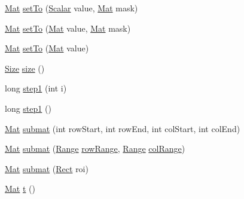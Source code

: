 \begin{DoxyCompactItemize}
\mbox{\hyperlink{classorg_1_1opencv_1_1core_1_1_mat}{Mat}} \mbox{\hyperlink{classorg_1_1opencv_1_1core_1_1_mat_a56d903b85bbe289ee484e1b22efa2a91}{set\+To}} (\mbox{\hyperlink{classorg_1_1opencv_1_1core_1_1_scalar}{Scalar}} value, \mbox{\hyperlink{classorg_1_1opencv_1_1core_1_1_mat}{Mat}} mask)
\item 
\mbox{\hyperlink{classorg_1_1opencv_1_1core_1_1_mat}{Mat}} \mbox{\hyperlink{classorg_1_1opencv_1_1core_1_1_mat_a793ccddcd93d47402e9b243ef75814b1}{set\+To}} (\mbox{\hyperlink{classorg_1_1opencv_1_1core_1_1_mat}{Mat}} value, \mbox{\hyperlink{classorg_1_1opencv_1_1core_1_1_mat}{Mat}} mask)
\item 
\mbox{\hyperlink{classorg_1_1opencv_1_1core_1_1_mat}{Mat}} \mbox{\hyperlink{classorg_1_1opencv_1_1core_1_1_mat_a3c0458f17815dd73f81e4a8dfebacb3b}{set\+To}} (\mbox{\hyperlink{classorg_1_1opencv_1_1core_1_1_mat}{Mat}} value)
\item 
\mbox{\hyperlink{classorg_1_1opencv_1_1core_1_1_size}{Size}} \mbox{\hyperlink{classorg_1_1opencv_1_1core_1_1_mat_a543d6f8a103a5f3d899030d76286f0cf}{size}} ()
\item 
long \mbox{\hyperlink{classorg_1_1opencv_1_1core_1_1_mat_a758053ee22fe72074db5934097477cfe}{step1}} (int i)
\item 
long \mbox{\hyperlink{classorg_1_1opencv_1_1core_1_1_mat_a657e61de4cb505cb637e8e88b12ac479}{step1}} ()
\item 
\mbox{\hyperlink{classorg_1_1opencv_1_1core_1_1_mat}{Mat}} \mbox{\hyperlink{classorg_1_1opencv_1_1core_1_1_mat_a3d3b68f34a2c1c3aaa56b1c75f09ae60}{submat}} (int row\+Start, int row\+End, int col\+Start, int col\+End)
\item 
\mbox{\hyperlink{classorg_1_1opencv_1_1core_1_1_mat}{Mat}} \mbox{\hyperlink{classorg_1_1opencv_1_1core_1_1_mat_a4a17b77ce9a3b6b497912153906c2d37}{submat}} (\mbox{\hyperlink{classorg_1_1opencv_1_1core_1_1_range}{Range}} \mbox{\hyperlink{classorg_1_1opencv_1_1core_1_1_mat_a182dbb37bbaa19e65cfcb99cf4d03fbe}{row\+Range}}, \mbox{\hyperlink{classorg_1_1opencv_1_1core_1_1_range}{Range}} \mbox{\hyperlink{classorg_1_1opencv_1_1core_1_1_mat_a28a58bdd7241151451c966e41da7e38b}{col\+Range}})
\item 
\mbox{\hyperlink{classorg_1_1opencv_1_1core_1_1_mat}{Mat}} \mbox{\hyperlink{classorg_1_1opencv_1_1core_1_1_mat_a37b5962d59cd8a91a081e232e07979f9}{submat}} (\mbox{\hyperlink{classorg_1_1opencv_1_1core_1_1_rect}{Rect}} roi)
\item 
\mbox{\hyperlink{classorg_1_1opencv_1_1core_1_1_mat}{Mat}} \mbox{\hyperlink{classorg_1_1opencv_1_1core_1_1_mat_a8df776cc748a0006e8837fcb7a1772f0}{t}} ()

\end{DoxyCompactItemize}
